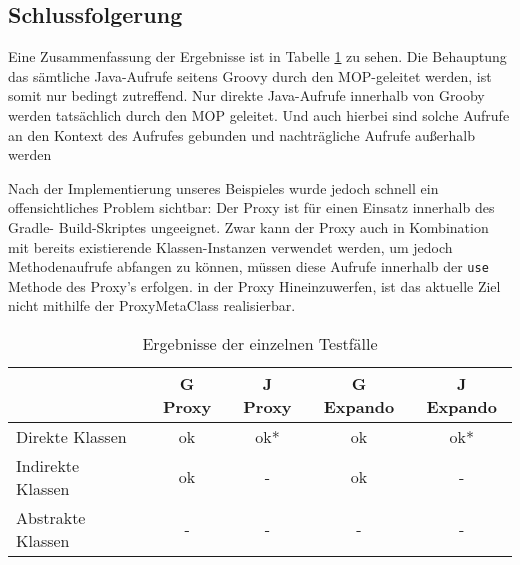 %

\subsection{Schlussfolgerung}

Eine Zusammenfassung der Ergebnisse ist in Tabelle \ref{tab:meta-result} zu sehen.
Die Behauptung das sämtliche Java-Aufrufe seitens Groovy durch den MOP-geleitet werden, ist somit nur bedingt zutreffend.
Nur direkte Java-Aufrufe innerhalb von Grooby werden tatsächlich durch den MOP geleitet.
Und auch hierbei sind solche Aufrufe an den Kontext des Aufrufes gebunden und nachträgliche Aufrufe außerhalb werden

Nach der Implementierung unseres Beispieles wurde jedoch schnell ein offensichtliches
Problem sichtbar: Der Proxy ist für einen Einsatz innerhalb des Gradle-
Build-Skriptes ungeeignet. 
Zwar kann der Proxy auch in Kombination mit bereits existierende
Klassen-Instanzen verwendet werden, um jedoch Methodenaufrufe abfangen
zu können, müssen diese Aufrufe innerhalb der \texttt{use} Methode des Proxy's erfolgen.
in der Proxy Hineinzuwerfen, ist das aktuelle Ziel nicht mithilfe der ProxyMetaClass realisierbar.

\begin{table}[hbt!]
	\centering
	\begin{tabular}{| l | c | c | c | c |}
		\hline
		\rule{0pt}{15pt}    & G Proxy & J Proxy & G Expando	& J Expando 	\\ 
		\hline
		Direkte Klassen		& ok 	& ok*  	& ok	& ok* 	\\
		Indirekte Klassen 	& ok 	& {-} 	& ok	& {-} 	\\
		Abstrakte Klassen	& {-} 	& {-} 	& {-}	& {-} 	\\
		\hline
	\end{tabular}
	\caption{Ergebnisse der einzelnen Testfälle}
	\label{tab:meta-result}
\end{table}

